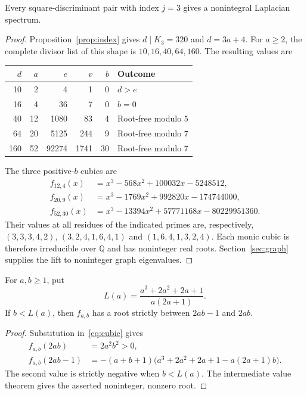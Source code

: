 \begin{lemma}
\label{lem:third-index}
Every square-discriminant pair with index $j=3$ gives a nonintegral
Laplacian spectrum.
\end{lemma}
\begin{proof}
Proposition~\ref{prop:index} gives $d\mid K_3=320$ and $d=3a+4$.
For $a\geq2$, the complete divisor list of this shape is
$10,16,40,64,160$. The resulting values are
\begin{center}
\begin{tabular}{rrrrrl}
\toprule
$d$ & $a$ & $e$ & $v$ & $b$ & Outcome\\
\midrule
10 & 2 & 4 & 1 & 0 & $d>e$\\
16 & 4 & 36 & 7 & 0 & $b=0$\\
40 & 12 & 1080 & 83 & 4 & Root-free modulo $5$\\
64 & 20 & 5125 & 244 & 9 & Root-free modulo $7$\\
160 & 52 & 92274 & 1741 & 30 & Root-free modulo $7$\\
\bottomrule
\end{tabular}
\end{center}
The three positive-$b$ cubics are
\begin{align*}
f_{12,4}(x)&=x^3-568x^2+100032x-5248512,\\
f_{20,9}(x)&=x^3-1769x^2+992820x-174744000,\\
f_{52,30}(x)&=x^3-13394x^2+57771168x-80229951360.
\end{align*}
Their values at all residues of the indicated primes are, respectively,
$(3,3,3,4,2)$, $(3,2,4,1,6,4,1)$ and $(1,6,4,1,3,2,4)$.
Each monic cubic is therefore irreducible over $\mathbb Q$ and has
noninteger real roots. Section~\ref{sec:graph} supplies the lift to
noninteger graph eigenvalues.
\end{proof}

\begin{lemma}
\label{lem:sign}
For $a,b\geq1$, put
\[
L(a)=\frac{a^3+2a^2+2a+1}{a(2a+1)}.
\]
If $b<L(a)$, then $f_{a,b}$ has a root strictly between $2ab-1$ and $2ab$.
\end{lemma}
\begin{proof}
Substitution in~\eqref{eq:cubic} gives
\begin{align*}
f_{a,b}(2ab)&=2a^2b^2>0,\\
f_{a,b}(2ab-1)&=-(a+b+1)
\bigl(a^3+2a^2+2a+1-a(2a+1)b\bigr).
\end{align*}
The second value is strictly negative when $b<L(a)$. The intermediate
value theorem gives the asserted noninteger, nonzero root.
\end{proof}


